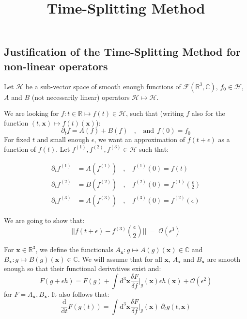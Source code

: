 \documentclass[11pt]{article}
\title{Time-Splitting Method}
\author{}
\date{}
\newcommand{\fder}[2]{\frac{\delta #1}{\delta f}\Bigr|_{#2}}
\begin{document}
\maketitle

\subsection*{Justification of the Time-Splitting Method for non-linear operators}

Let $\mathcal{H}$ be a sub-vector space of smooth enough functions of $\mathcal{F}(\mathbb{R}^3,\mathbb{C})$, $f_0\in \mathcal{H}$, $A$ and $B$ (not necessarily linear) operators $\mathcal{H} \longmapsto \mathcal{H}$.\par
We are looking for $f:t\in \mathbb{R} \longmapsto f(t)\in \mathcal{H}$, such that (writing $f$ also for the function $(t,\mathbf{x}) \longmapsto f(t)(\mathbf{x})$):
\begin{equation}\label{initialEq}
    \partial_t f = A(f) + B(f)~~~~,~~~~\text{and} ~~ f(0)=f_0
\end{equation}
For fixed $t$ and small enough $\epsilon$, we want an approximation of $f(t+\epsilon)$ as a function of $f(t)$. Let $f^{(1)},f^{(2)},f^{(3)}\in \mathcal{H}$ such that:

\begin{equation}\label{TSM}
\begin{split}
    \partial_t f^{(1)} &= A(f^{(1)})~~~~,~~~~ f^{(1)}(0)=f(t)\\
    \partial_t f^{(2)} &= B(f^{(2)})~~~~,~~~~ f^{(2)}(0)=f^{(1)}(\frac{\epsilon}{2})\\
    \partial_t f^{(3)} &= A(f^{(3)})~~~~,~~~~ f^{(3)}(0)=f^{(2)}(\epsilon)
    \end{split}
\end{equation}

We are going to show that:
\begin{equation}\label{Theo}
    ||f(t+\epsilon)-f^{(3)}(\frac{\epsilon}{2})|| ~=~ \mathcal{O}(\epsilon^3)
\end{equation}

For $\mathbf{x}\in \mathbb{R}^3$, we define the functionals $A_\mathbf{x} : g \longmapsto A(g)(\mathbf{x})\in \mathbb{C}$ and $B_\mathbf{x} : g \longmapsto B(g)(\mathbf{x})\in \mathbb{C}$. We will assume that for all $\mathbf{x}$, $A_\mathbf{x}$ and $B_\mathbf{x}$ are smooth enough so that their functional derivatives exist and:
\begin{equation}\label{Taylor}
    F(g+\epsilon h)=F(g)+\int\text{d}^3\mathbf{x}\fder{F}{g}(\mathbf{x})\epsilon h(\mathbf{x})+\mathcal{O}(\epsilon^2)
\end{equation}
for $F=A_\mathbf{x},B_\mathbf{x}$. It also follows that:
\begin{equation}\label{totalder}
    \frac{\text{d}}{\text{d}t}F(g(t))=\int\text{d}^3\mathbf{x}\fder{F}{g}(\mathbf{x})~\partial_t g(t,\mathbf{x})
\end{equation}
\end{document}
